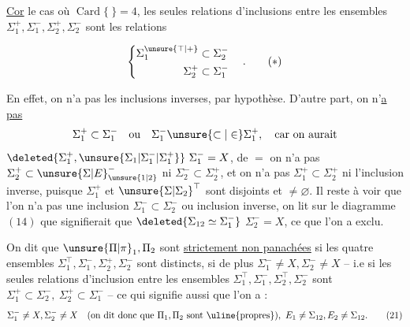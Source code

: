 \begingroup\makeatletter\tagsleft@true\makeatother
\uline{Cor}  le cas où $\operatorname{Card}\{\ \}=4$,  les seules relations d'inclusions entre les ensembles $\Sigma_1^+,\Sigma_1^-,\Sigma_2^+,\Sigma_2^-$ sont les relations

\[
\left\{\begin{aligned}
\Sigma_1^{\unsure{\top|+}}&\subset\Sigma_2^-\\
\Sigma_2^+&\subset\Sigma_1^-
\end{aligned}\right.\quad .
\tag*{($*$)}
\]

En effet, on n'a pas les inclusions inverses, par hypothèse. D'autre part, on n'\uline{a pas}
\[
\Sigma_1^+\subset\Sigma_1^-\quad\text{ou}\quad
\Sigma_1^-\unsure{\subset|\in}\Sigma_1^+,\quad\text{car on aurait}
\]
$\deleted{\Sigma_1^+,\unsure{\Sigma_1|\Sigma_1^-|\Sigma_1^+}}\ \Sigma_1^-=X$, de $=$ on n'a pas $\Sigma_2^+\subset\unsure{\Sigma|E}_{\unsure{1|2}}^-$ ni $\Sigma_2^-\subset\Sigma_2^+$, et on n'a pas $\Sigma_1^+\subset\Sigma_2^+$ ni l'inclusion inverse, puisque $\Sigma_1^+$ et $\unsure{\Sigma|\Sigma_2}^{\top}$ sont disjoints et $\ne\varnothing$. Il reste à voir que l'on n'a pas une inclusion $\Sigma_1^-\subset\Sigma_2^-$ ou inclusion inverse, on lit sur le diagramme $(14)$ que   signifierait que $\deleted{\Sigma_{12}\simeq\Sigma_1^-}$  $\Sigma_2^-=X$, ce que l'on a exclu.

\noindent\makebox[0pt][r]{\rule[-30ex]{.4pt}{32ex}\hspace{.55em}}\uline{} On dit que $\unsure{\Pi|\pi}_1,\Pi_2$ sont \uline{strictement non panachées}  si les quatre ensembles $\Sigma_1^{\top},\Sigma_1^-,\Sigma_2^+,\Sigma_2^-$ sont distincts,  si  de plus $\Sigma_1^-\ne X,\Sigma_2^-\ne X$ -- i.e si les seules relations d'inclusion entre les ensembles $\Sigma_1^{\top},\Sigma_1^-,\Sigma_2^{\top},\Sigma_2^-$ sont $\Sigma_1^+\subset\Sigma_2^-,\ \Sigma_2^+\subset\Sigma_1^-$ -- ce qui signifie aussi que l'on a :
\[
\Sigma_1^-\ne X,\Sigma_2^-\ne X
\quad(\text{on dit donc que }\Pi_1,\Pi_2\text{ sont \uline{propres}}),
\ E_1\ne\Sigma_{12},E_2\ne\Sigma_{12}.
\tag*{(21)}
\]
\endgroup
\clearpage
